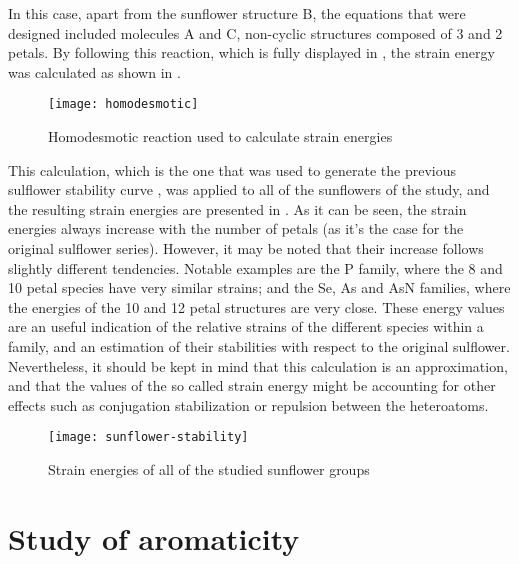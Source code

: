 In this case, apart from the sunflower structure B, the equations that were designed included molecules A and C, non-cyclic structures composed of 3 and 2 petals.  By following this reaction, which is fully displayed in , the strain energy was calculated as shown in .

\begin{figure}
    \centering
    \texttt{[image: homodesmotic]}
    \caption[Homodesmotic reaction used to calculate strain energies]{Homodesmotic reaction used to calculate strain energies}
\end{figure}

This calculation, which is the one that was used to generate the previous sulflower stability curve , was applied to all of the sunflowers of the study, and the resulting strain energies are presented in .
As it can be seen, the strain energies always increase with the number of petals (as it's the case for the original sulflower series).
However, it may be noted that their increase follows slightly different tendencies.
Notable examples are the P family, where the 8 and 10 petal species have very similar strains; and the Se, As and AsN families, where the energies of the 10 and 12 petal structures are very close.
These energy values are an useful indication of the relative strains of the different species within a family, and an estimation of their
stabilities with respect to the original sulflower.
Nevertheless, it should be kept in mind that this calculation is an approximation, and that the values of the so called strain energy might be accounting for other effects such as conjugation stabilization or repulsion between the heteroatoms.

\begin{figure}
    \centering
    \texttt{[image: sunflower-stability]}
    \caption[Strain energies of sunflower groups]{Strain energies of all of the studied sunflower groups}
\end{figure}


\section{Study of aromaticity}

